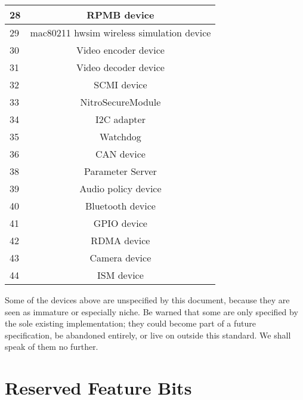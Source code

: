 \begin{tabular} { |l|c| }
\hline
28         &   RPMB device \\
\hline
29         &   mac80211 hwsim wireless simulation device \\
\hline
30         &   Video encoder device \\
\hline
31         &   Video decoder device \\
\hline
32         &   SCMI device \\
\hline
33         &   NitroSecureModule \\
\hline
34         &   I2C adapter \\
\hline
35         &   Watchdog \\
\hline
36         &   CAN device \\
\hline
38         &   Parameter Server \\
\hline
39         &   Audio policy device \\
\hline
40         &   Bluetooth device \\
\hline
41         &   GPIO device \\
\hline
42         &   RDMA device \\
\hline
43         &   Camera device \\
\hline
44         &   ISM device \\
\hline
\end{tabular}

Some of the devices above are unspecified by this document,
because they are seen as immature or especially niche.  Be warned
that some are only specified by the sole existing implementation;
they could become part of a future specification, be abandoned
entirely, or live on outside this standard.  We shall speak of
them no further.





















\chapter{Reserved Feature Bits}\label{sec:Reserved Feature Bits}

